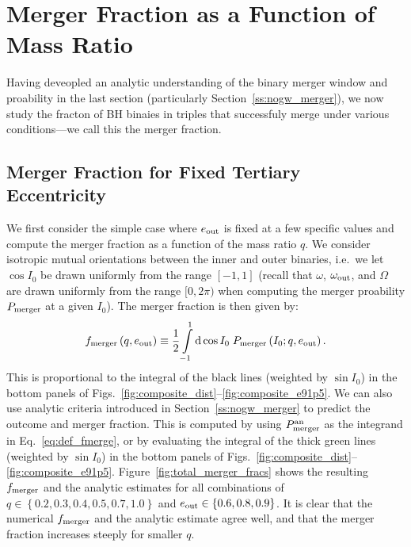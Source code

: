 \documentclass[
        fleqn,
        usenatbib,
    ]{mnras}
\newcommand*{\p}[1]{\left(#1\right)}
\newcommand*{\z}[1]{\left\{#1\right\}}
\begin{document}
\section{Merger Fraction as a Function of Mass Ratio}\label{s:merger_frac}

Having deveopled an analytic understanding of the binary merger window and
proability in the last section (particularly Section~\ref{ss:nogw_merger}), we
now study the fracton of BH binaies in triples that successfuly merge under
various conditions---we call this the merger fraction.

\subsection{Merger Fraction for Fixed Tertiary Eccentricity}

We first consider the simple case where $e_{\rm out}$ is fixed at a few
specific values and compute the merger fraction as a function of the mass ratio
$q$. We consider isotropic mutual orientations between the inner and outer
binaries, i.e.\ we let $\cos I_0$ be drawn uniformly from the range $[-1, 1]$
(recall that $\omega$, $\omega_{\rm out}$, and $\Omega$ are drawn uniformly from
the range $[0, 2\pi)$ %
when computing the merger proability $P_{\rm merger}$ at a given $I_0$). The
merger fraction is then given by:
\begin{equation}
    f_{\rm merger}\p{q, e_{\rm out}} \equiv
        \frac{1}{2}\int\limits_{-1}^1\mathrm{d}\cos I_0\;
            P_{\rm merger}\p{I_0; q, e_{\rm out}} .\label{eq:def_fmerge}
\end{equation}
This is proportional to the integral of the black lines (weighted by $\sin I_0$)
in the bottom panels of
Figs.~\ref{fig:composite_dist}--\ref{fig:composite_e91p5}. We can also use
analytic criteria introduced in Section~\ref{ss:nogw_merger} to predict the
outcome and merger fraction. This is computed by using $P_{\rm merger}^{\rm an}$
as the integrand in Eq.~\eqref{eq:def_fmerge}, or by evaluating the integral of
the thick green lines (weighted by $\sin I_0$) in the bottom panels of
Figs.~\ref{fig:composite_dist}--\ref{fig:composite_e91p5}.
Figure~\ref{fig:total_merger_fracs} shows the resulting $f_{\rm merger}$ and the
analytic estimates for all combinations of $q \in \z{0.2, 0.3, 0.4, 0.5, 0.7,
1.0}$ and $e_{\rm out} \in \z{0.6, 0.8, 0.9}$. It is clear that the numerical
$f_{\rm merger}$ and the analytic estimate agree well, and that the merger
fraction increases steeply for smaller $q$.
\end{document}
